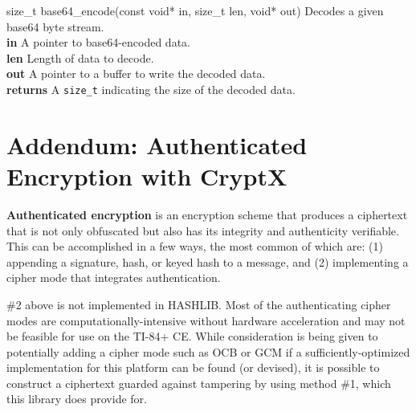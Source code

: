 \documentclass[titlepage]{article}
\begin{document}
				\begin{functionspec}[]{size\_t base64\_encode(const void* in, size\_t len, void* out)}
					Decodes a given base64 byte stream.\\
					\textbf{in} A pointer to base64-encoded data.\\
					\textbf{len} Length of data to decode.\\
					\textbf{out} A pointer to a buffer to write the decoded data.\\
					\textbf{returns} A \texttt{size\_t} indicating the size of the decoded data.
				\end{functionspec}
		\newpage
		\section{Addendum: Authenticated Encryption with CryptX}
			\label{sec:auth}
			\textbf{Authenticated encryption} is an encryption scheme that produces a ciphertext that is not only obfuscated but also has its integrity and authenticity verifiable. This can be accomplished in a few ways, the most common of which are: (1) appending a signature, hash, or keyed hash to a message, and (2) implementing a cipher mode that integrates authentication.
			
			\#2 above is not implemented in HASHLIB. Most of the authenticating cipher modes are computationally-intensive without hardware acceleration and may not be feasible for use on the TI-84+ CE. While consideration is being given to potentially adding a cipher mode such as OCB or GCM if a sufficiently-optimized implementation for this platform can be found (or devised), it is possible to construct a ciphertext guarded against tampering by using method \#1, which this library does provide for.
			
\end{document}
